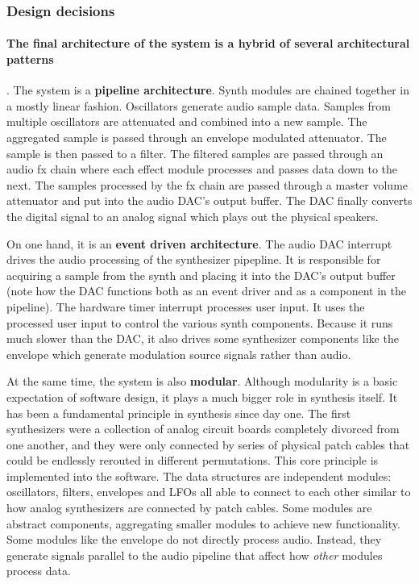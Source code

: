 \documentclass[acmlarge,screen]{acmart}
\begin{document}
	\subsubsection{Design decisions}
	\paragraph{The final architecture of the system is a hybrid of several architectural patterns}. The system is a \textbf{pipeline architecture}. Synth modules are chained together in a mostly linear fashion. Oscillators generate audio sample data. Samples from multiple oscillators are attenuated and combined into a new sample. The aggregated sample is passed through an envelope modulated attenuator. The sample is then passed to a filter. The filtered samples are passed through an audio fx chain where each effect module processes and passes data down to the next. The samples processed by the fx chain are passed through a master volume attenuator and put into the audio DAC's output buffer. The DAC finally converts the digital signal to an analog signal which plays out the physical speakers.
	
	On one hand, it is an \textbf{event driven architecture}. The audio DAC interrupt drives the audio processing of the synthesizer pipepline. It is responsible for acquiring a sample from the synth and placing it into the DAC's output buffer (note how the DAC functions both as an event driver and as a component in the pipeline). The hardware timer interrupt processes user input. It uses the processed user input to control the various synth components. Because it runs much slower than the DAC, it also drives some synthesizer components like the envelope which generate modulation source signals rather than audio.
	
	At the same time, the system is also \textbf{modular}. Although modularity is a basic expectation of software design, it plays a much bigger role in synthesis itself. It has been a fundamental principle in synthesis since day one. The first synthesizers were a collection of analog circuit boards completely divorced from one another, and they were only connected by series of physical patch cables that could be endlessly rerouted in different permutations. This core principle is implemented into the software. The data structures are independent modules: oscillators, filters, envelopes and LFOs all able to connect to each other similar to how analog synthesizers are connected by patch cables. Some modules are abstract components, aggregating smaller modules to achieve new functionality. Some modules like the envelope do not directly process audio. Instead, they generate signals parallel to the audio pipeline that affect how \textit{other} modules process data.
\end{document}
